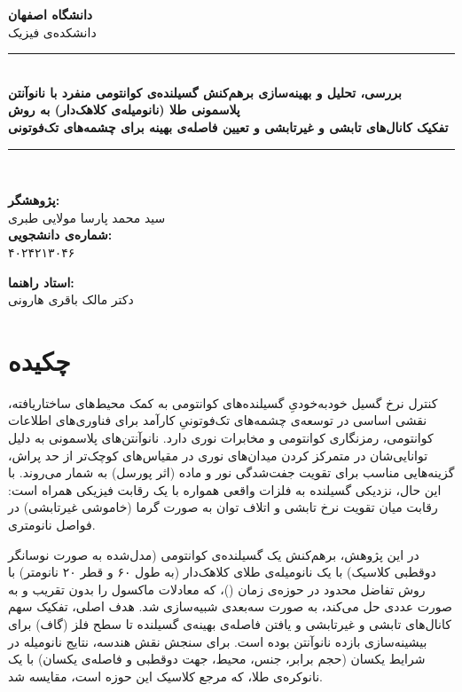 \documentclass[12pt,a4paper]{report}
\begin{document}
\begin{titlepage}
\begin{center}
\vspace*{1.5cm}
{\Large\textbf{دانشگاه اصفهان}}\\[6pt]
{\large دانشکده‌ی فیزیک}\\[4pt]
\rule{\textwidth}{0.6pt}\\[10pt]
{\LARGE\textbf{بررسی، تحلیل و بهینه‌سازی برهم‌کنش گسیلنده‌ی کوانتومی منفرد با نانوآنتن پلاسمونی طلا
(نانومیله‌ی کلاهک‌دار) به روش }}\\[14pt]
{\large\textbf{تفکیک کانال‌های تابشی و غیرتابشی و تعیین فاصله‌ی بهینه برای چشمه‌های تک‌فوتونی}}\\[10pt]
\rule{\textwidth}{0.6pt}\\[2.5cm]
\begin{minipage}[t]{0.48\textwidth}
\textbf{پژوهشگر:}\\
سید محمد پارسا مولایی طبری\\[12pt]
\textbf{شماره‌ی دانشجویی:}\\
۴۰۲۴۲۱۳۰۴۶
\end{minipage}\hfill
\begin{minipage}[t]{0.42\textwidth}
\textbf{استاد راهنما:}\\
دکتر مالک باقری هارونی
\end{minipage}
\end{center}
\end{titlepage}

\chapter*{چکیده}
کنترل نرخ گسیل خودبه‌خودیِ گسیلنده‌های کوانتومی به کمک محیط‌های ساختاریافته، نقشی اساسی در توسعه‌ی چشمه‌های تک‌فوتونیِ کارآمد برای فناوری‌های اطلاعات کوانتومی، رمزنگاری کوانتومی و مخابرات نوری دارد. نانوآنتن‌های پلاسمونی به دلیل توانایی‌شان در متمرکز کردن میدان‌های نوری در مقیاس‌های کوچک‌تر از حد پراش، گزینه‌هایی مناسب برای تقویت جفت‌شدگی نور و ماده (اثر پورسل) به شمار می‌روند. با این حال، نزدیکی گسیلنده به فلزات واقعی همواره با یک رقابت فیزیکی همراه است: رقابت میان تقویت نرخ تابشی و اتلاف توان به صورت گرما (خاموشی غیرتابشی) در فواصل نانومتری.

در این پژوهش، برهم‌کنش یک گسیلنده‌ی کوانتومی (مدل‌شده به صورت نوسانگر دوقطبی کلاسیک) با یک نانومیله‌ی طلای کلاهک‌دار (به طول ۶۰ و قطر ۲۰ نانومتر) با روش تفاضل محدود در حوزه‌ی زمان ()، که معادلات ماکسول را بدون تقریب و به صورت عددی حل می‌کند، به صورت سه‌بعدی شبیه‌سازی شد. هدف اصلی، تفکیک سهم کانال‌های تابشی و غیرتابشی و یافتن فاصله‌ی بهینه‌ی گسیلنده تا سطح فلز (گاف) برای بیشینه‌سازی بازده نانوآنتن بوده است. برای سنجش نقش هندسه، نتایج نانومیله در شرایط یکسان (حجم برابر، جنس، محیط، جهت دوقطبی و فاصله‌ی یکسان) با یک نانوکره‌ی طلا، که مرجع کلاسیک این حوزه است، مقایسه شد.
\end{document}
